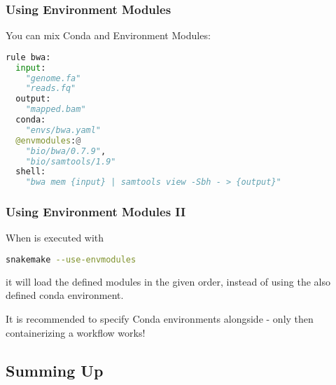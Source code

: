 \begin{frame}[fragile]
  \frametitle{Using Environment Modules}
  You can mix Conda and Environment Modules:
  \begin{lstlisting}[language=Python,style=Python]
rule bwa:
  input:
    "genome.fa"
    "reads.fq"
  output:
    "mapped.bam"
  conda:
    "envs/bwa.yaml"
  @envmodules:@
    "bio/bwa/0.7.9",
    "bio/samtools/1.9"
  shell:
    "bwa mem {input} | samtools view -Sbh - > {output}"
  \end{lstlisting}
\end{frame}

\begin{frame}[fragile]
  \frametitle{Using Environment Modules II}
  When \Snakemake{} is executed with 
  \begin{lstlisting}[language=Bash, style=Shell]
snakemake --use-envmodules
  \end{lstlisting}
  it will load the defined modules in the given order, instead of using the also defined conda environment.
  \pause
  \begin{hint}
  	It is recommended to specify Conda environments alongside - only then containerizing a workflow works!
  \end{hint}
\end{frame}

\subsection{Summing Up}

